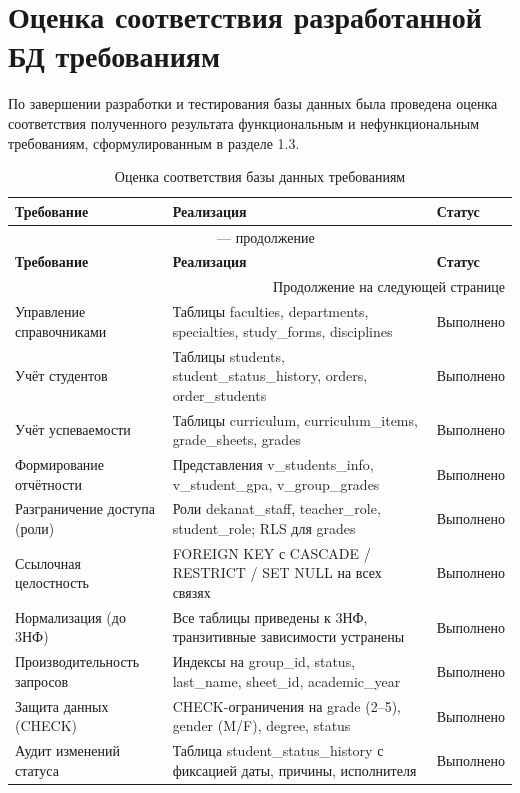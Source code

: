 \documentclass[14pt, a4paper]{extreport}
\begin{document}
\section{Оценка соответствия разработанной БД требованиям}
По завершении разработки и тестирования базы данных была проведена оценка соответствия полученного результата функциональным и нефункциональным требованиям, сформулированным в разделе 1.3.

\begin{longtable}{p{5cm} p{7cm} p{2.5cm}}
\caption{Оценка соответствия базы данных требованиям} \\
\toprule
\textbf{Требование} & \textbf{Реализация} & \textbf{Статус} \\
\midrule
\endfirsthead
\multicolumn{3}{c}{{\tablename\ \thetable{} --- продолжение}} \\
\toprule
\textbf{Требование} & \textbf{Реализация} & \textbf{Статус} \\
\midrule
\endhead
\midrule
\multicolumn{3}{r}{{Продолжение на следующей странице}} \\
\endfoot
\bottomrule
\endlastfoot
Управление справочниками & Таблицы faculties, departments, specialties, study\_forms, disciplines & Выполнено \\
Учёт студентов & Таблицы students, student\_status\_history, orders, order\_students & Выполнено \\
Учёт успеваемости & Таблицы curriculum, curriculum\_items, grade\_sheets, grades & Выполнено \\
Формирование отчётности & Представления v\_students\_info, v\_student\_gpa, v\_group\_grades & Выполнено \\
Разграничение доступа (роли) & Роли dekanat\_staff, teacher\_role, student\_role; RLS для grades & Выполнено \\
Ссылочная целостность & FOREIGN KEY с CASCADE / RESTRICT / SET NULL на всех связях & Выполнено \\
Нормализация (до 3НФ) & Все таблицы приведены к 3НФ, транзитивные зависимости устранены & Выполнено \\
Производительность запросов & Индексы на group\_id, status, last\_name, sheet\_id, academic\_year & Выполнено \\
Защита данных (CHECK) & CHECK-ограничения на grade (2--5), gender (M/F), degree, status & Выполнено \\
Аудит изменений статуса & Таблица student\_status\_history с фиксацией даты, причины, исполнителя & Выполнено \\
\end{longtable}
\end{document}
